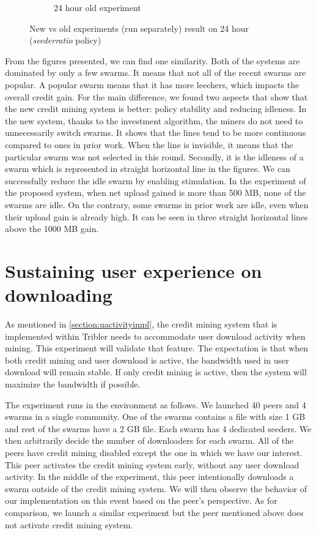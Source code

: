 \begin{figure}[h]
\begin{adjustwidth}{-1.5cm}{}
\begin{subfigure}[t]{0.6\textwidth}
			\caption{24 hour old experiment}
			\label{fig:oldetree24}
		\end{subfigure}
		\caption{New vs old experiments (run separately) result on 24 hour (\textit{seederratio} policy)}
	\end{adjustwidth}
\end{figure}
From the figures presented, we can find one similarity. Both of the systems are dominated by only a few swarms. It means that not all of the recent swarms are popular. A popular swarm means that it has more leechers, which impacts the overall credit gain. For the main difference, we found two aspects that show that the new credit mining system is better: policy stability and reducing idleness. In the new system, thanks to the investment algorithm, the miners do not need to unnecessarily switch swarms. It shows that the lines tend to be more continuous compared to ones in prior work. When the line is invisible, it means that the particular swarm was not selected in this round. Secondly, it is the idleness of a swarm which is represented in straight horizontal line in the figures. We can successfully reduce the idle swarm by enabling stimulation. In the experiment of the proposed system, when net upload gained is more than 500 MB, none of the swarms are idle. On the contrary, some swarms in prior work are idle, even when their upload gain is already high. It can be seen in three straight horizontal lines above the 1000 MB gain.

 
\section{Sustaining user experience on downloading}
\label{section:expprio}
As mentioned in \ref{section:uactivityimpl}, the credit mining system that is implemented within Tribler needs to accommodate user download activity when mining. This experiment will validate that feature. The expectation is that when both credit mining and user download is active, the bandwidth used in user download will remain stable. If only credit mining is active, then the system will maximize the bandwidth if possible. 

The experiment runs in the environment as follows. We launched 40 peers and 4 swarms in a single community. One of the swarms contains a file with size 1 GB and rest of the swarms have a 2 GB file. Each swarm has 4 dedicated seeders. We then arbitrarily decide the number of downloaders for each swarm. All of the peers have credit mining disabled except the one in which we have our interest. This peer activates the credit mining system early, without any user download activity. In the middle of the experiment, this peer intentionally downloads a swarm outside of the credit mining system. We will then observe the behavior of our implementation on this event based on the peer's perspective. As for comparison, we launch a similar experiment but the peer mentioned above does not activate credit mining system. 

